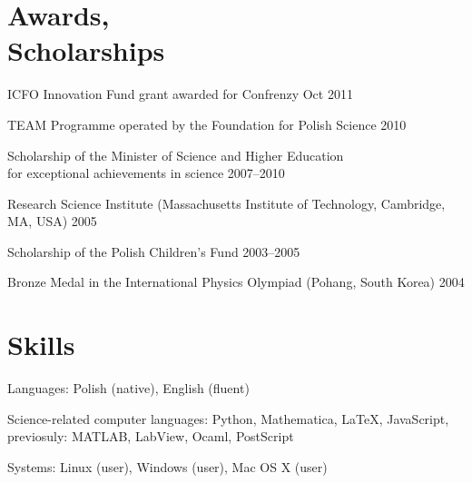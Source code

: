 \documentclass[margin,line]{resume}
\begin{document}
\begin{resume}
    \section{\mysidestyle Awards,\\Scholarships}
    \begin{list2}
    	\item ICFO Innovation Fund grant awarded for Confrenzy \hfill Oct 2011
        \item TEAM Programme operated by the Foundation for Polish Science \hfill 2010
        \item Scholarship of the Minister of Science and Higher Education\\for exceptional achievements in science \hfill 2007--2010
        \item Research Science Institute (Massachusetts Institute of Technology, Cambridge, MA, USA) \hfill 2005
        \item Scholarship of the Polish Children's Fund \hfill 2003--2005
        \item Bronze Medal in the International Physics Olympiad (Pohang, South Korea) \hfill 2004
    \end{list2}

\newpage

    \section{\mysidestyle Skills}
    \begin{list2}
        \item Languages: Polish (native), English (fluent)
        \item Science-related computer languages: Python, Mathematica, LaTeX, JavaScript, previosuly: MATLAB, LabView, Ocaml, PostScript
        \item Systems: Linux (user), Windows (user), Mac OS X (user)
    \end{list2}


\end{resume}
\end{document}
